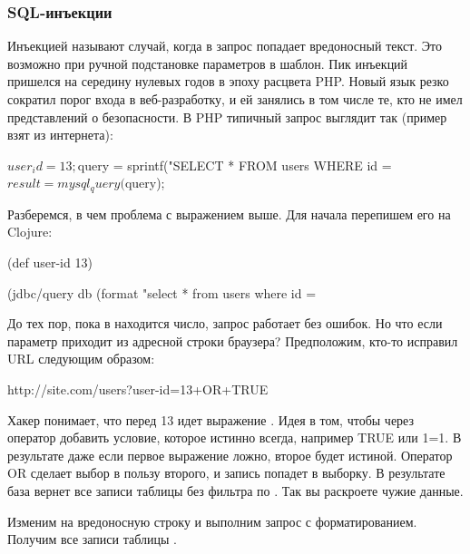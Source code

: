 \subsubsection{SQL-инъекции}

Инъекцией называют случай, когда в запрос попадает вредоносный текст. Это возможно при ручной подстановке параметров в шаблон. Пик инъекций пришелся на середину нулевых годов в эпоху расцвета PHP. Новый язык резко сократил порог входа в веб-разработку, и ей занялись в том числе те, кто не имел представлений о безопасности. В PHP типичный запрос выглядит так (пример взят из интернета):

\begin{english}
  \begin{php}
$user_id = 13;
$query = sprintf("SELECT * FROM users WHERE id = %
$result = mysql_query($query);
  \end{php}
\end{english}

Разберемся, в чем проблема с выражением выше. Для начала перепишем его на Clojure:

\begin{english}
  \begin{clojure}
(def user-id 13)

(jdbc/query db (format "select * from users where id = %
  \end{clojure}
\end{english}

До тех пор, пока в  находится число, запрос работает без ошибок. Но что если параметр приходит из адресной строки браузера? Предположим, кто-то исправил URL следующим образом:

\begin{english}
  \begin{text}
http://site.com/users?user-id=13+OR+TRUE
  \end{text}
\end{english}

Хакер понимает, что перед 13 идет выражение . Идея в том, чтобы через оператор  добавить условие, которое истинно всегда, например TRUE или 1=1. В результате даже если первое выражение ложно, второе будет истиной. Оператор OR сделает выбор в пользу второго, и запись попадет в выборку. В результате база вернет все записи таблицы без фильтра по . Так вы раскроете чужие данные.

Изменим  на вредоносную строку и выполним запрос с форматированием. Получим все записи таблицы .


